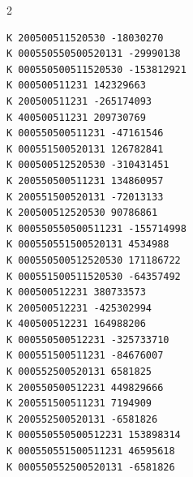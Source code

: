 \begin{multicols}{2}
\begin{Verbatim}[fontsize=\footnotesize]
K 200500511520530 -18030270
K 000550550500520131 -29990138
K 000550500511520530 -153812921
K 000500511231 142329663
K 200500511231 -265174093
K 400500511231 209730769
K 000550500511231 -47161546
K 000551500520131 126782841
K 000500512520530 -310431451
K 200550500511231 134860957
K 200551500520131 -72013133
K 200500512520530 90786861
K 000550550500511231 -155714998
K 000550551500520131 4534988
K 000550500512520530 171186722
K 000551500511520530 -64357492
K 000500512231 380733573
K 200500512231 -425302994
K 400500512231 164988206
K 000550500512231 -325733710
K 000551500511231 -84676007
K 000552500520131 6581825
K 200550500512231 449829666
K 200551500511231 7194909
K 200552500520131 -6581826
K 000550550500512231 153898314
K 000550551500511231 46595618
K 000550552500520131 -6581826
\end{Verbatim}
\end{multicols}

